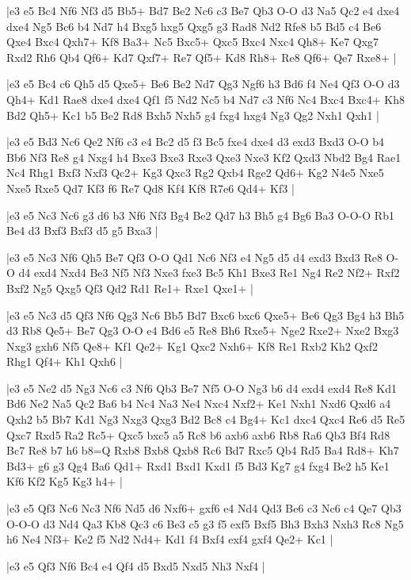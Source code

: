 \whitename{}
\blackname{}
\makegametitle
|e3 e5 Bc4 Nf6 Nf3 d5 Bb5+ Bd7 Be2 Nc6 c3 Be7 Qb3 O-O d3 Na5 Qc2 e4 dxe4 dxe4 Ng5 Bc6 b4 Nd7 h4 Bxg5 hxg5 Qxg5 g3 Rad8 Nd2 Rfe8 b5 Bd5 c4 Be6 Qxe4 Bxc4 Qxh7+ Kf8 Ba3+ Nc5 Bxc5+ Qxc5 Bxc4 Nxc4 Qh8+ Ke7 Qxg7 Rxd2 Rh6 Qb4 Qf6+ Kd7 Qxf7+ Re7 Qf5+ Kd8 Rh8+ Re8 Qf6+ Qe7 Rxe8+  |

\whitename{}
\blackname{}
\makegametitle
|e3 e5 Bc4 c6 Qh5 d5 Qxe5+ Be6 Be2 Nd7 Qg3 Ngf6 h3 Bd6 f4 Ne4 Qf3 O-O d3 Qh4+ Kd1 Rae8 dxe4 dxe4 Qf1 f5 Nd2 Nc5 b4 Nd7 c3 Nf6 Nc4 Bxc4 Bxc4+ Kh8 Bd2 Qh5+ Kc1 b5 Be2 Rd8 Bxh5 Nxh5 g4 fxg4 hxg4 Ng3 Qg2 Nxh1 Qxh1  |

\whitename{}
\blackname{}
\makegametitle
|e3 e5 Bd3 Nc6 Qe2 Nf6 c3 e4 Bc2 d5 f3 Bc5 fxe4 dxe4 d3 exd3 Bxd3 O-O b4 Bb6 Nf3 Re8 g4 Nxg4 h4 Bxe3 Bxe3 Rxe3 Qxe3 Nxe3 Kf2 Qxd3 Nbd2 Bg4 Rae1 Nc4 Rhg1 Bxf3 Nxf3 Qc2+ Kg3 Qxc3 Rg2 Qxb4 Rge2 Qd6+ Kg2 N4e5 Nxe5 Nxe5 Rxe5 Qd7 Kf3 f6 Re7 Qd8 Kf4 Kf8 R7e6 Qd4+ Kf3  |

\whitename{}
\blackname{}
\makegametitle
|e3 e5 Nc3 Nc6 g3 d6 b3 Nf6 Nf3 Bg4 Be2 Qd7 h3 Bh5 g4 Bg6 Ba3 O-O-O Rb1 Be4 d3 Bxf3 Bxf3 d5 g5 Bxa3  |

\whitename{}
\blackname{}
\makegametitle
|e3 e5 Nc3 Nf6 Qh5 Be7 Qf3 O-O Qd1 Nc6 Nf3 e4 Ng5 d5 d4 exd3 Bxd3 Re8 O-O d4 exd4 Nxd4 Be3 Nf5 Nf3 Nxe3 fxe3 Bc5 Kh1 Bxe3 Re1 Ng4 Re2 Nf2+ Rxf2 Bxf2 Ng5 Qxg5 Qf3 Qd2 Rd1 Re1+ Rxe1 Qxe1+  |

\whitename{}
\blackname{}
\makegametitle
|e3 e5 Nc3 d5 Qf3 Nf6 Qg3 Nc6 Bb5 Bd7 Bxc6 bxc6 Qxe5+ Be6 Qg3 Bg4 h3 Bh5 d3 Rb8 Qe5+ Be7 Qg3 O-O e4 Bd6 e5 Re8 Bh6 Rxe5+ Nge2 Rxe2+ Nxe2 Bxg3 Nxg3 gxh6 Nf5 Qe8+ Kf1 Qe2+ Kg1 Qxc2 Nxh6+ Kf8 Re1 Rxb2 Kh2 Qxf2 Rhg1 Qf4+ Kh1 Qxh6  |

\whitename{}
\blackname{}
\makegametitle
|e3 e5 Ne2 d5 Ng3 Nc6 c3 Nf6 Qb3 Be7 Nf5 O-O Ng3 b6 d4 exd4 exd4 Re8 Kd1 Bd6 Ne2 Na5 Qc2 Ba6 b4 Nc4 Na3 Ne4 Nxc4 Nxf2+ Ke1 Nxh1 Nxd6 Qxd6 a4 Qxh2 b5 Bb7 Kd1 Ng3 Nxg3 Qxg3 Bd2 Bc8 c4 Bg4+ Kc1 dxc4 Qxc4 Re6 d5 Re5 Qxc7 Rxd5 Ra2 Rc5+ Qxc5 bxc5 a5 Rc8 b6 axb6 axb6 Rb8 Ra6 Qb3 Bf4 Rd8 Bc7 Re8 b7 h6 b8=Q Rxb8 Bxb8 Qxb8 Rc6 Bd7 Rxc5 Qb4 Rd5 Ba4 Rd8+ Kh7 Bd3+ g6 g3 Qg4 Ba6 Qd1+ Rxd1 Bxd1 Kxd1 f5 Bd3 Kg7 g4 fxg4 Be2 h5 Ke1 Kf6 Kf2 Kg5 Kg3 h4+  |

\whitename{}
\blackname{}
\makegametitle
|e3 e5 Qf3 Nc6 Nc3 Nf6 Nd5 d6 Nxf6+ gxf6 e4 Nd4 Qd3 Be6 c3 Nc6 c4 Qe7 Qb3 O-O-O d3 Nd4 Qa3 Kb8 Qc3 c6 Be3 c5 g3 f5 exf5 Bxf5 Bh3 Bxh3 Nxh3 Rc8 Ng5 h6 Ne4 Nf3+ Ke2 f5 Nd2 Nd4+ Kd1 f4 Bxf4 exf4 gxf4 Qe2+ Kc1  |

\whitename{}
\blackname{}
\makegametitle
|e3 e5 Qf3 Nf6 Bc4 e4 Qf4 d5 Bxd5 Nxd5 Nh3 Nxf4  |

